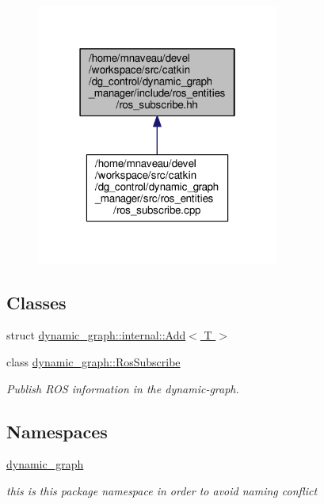 \begin{figure}[H]
\begin{center}
\leavevmode
\includegraphics[width=226pt]{ros__subscribe_8hh__dep__incl}
\end{center}
\end{figure}
\subsection*{Classes}
\begin{DoxyCompactItemize}
\item 
struct \hyperlink{structdynamic__graph_1_1internal_1_1Add}{dynamic\+\_\+graph\+::internal\+::\+Add$<$ T $>$}
\item 
class \hyperlink{classdynamic__graph_1_1RosSubscribe}{dynamic\+\_\+graph\+::\+Ros\+Subscribe}
\begin{DoxyCompactList}\small\item\em Publish R\+OS information in the dynamic-\/graph. \end{DoxyCompactList}\end{DoxyCompactItemize}
\subsection*{Namespaces}
\begin{DoxyCompactItemize}
\item 
 \hyperlink{namespacedynamic__graph}{dynamic\+\_\+graph}
\begin{DoxyCompactList}\small\item\em this is this package namespace in order to avoid naming conflict \end{DoxyCompactList}\end{DoxyCompactItemize}

